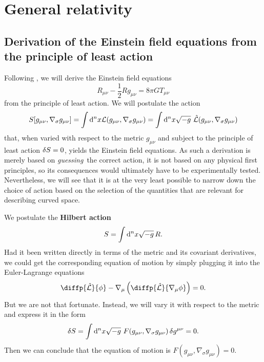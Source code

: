 \appendix

\chapter{General relativity}

\section{Derivation of the Einstein field equations from the principle of least action}
\label{sec:einstein_derivation}

Following \cite[section 4.3]{ref:carroll}, we will derive the Einstein field equations
\begin{equation}
	R_{\mu \nu} - \frac{1}{2} R g_{\mu \nu} = 8 \pi G T_{\mu \nu}
\end{equation}
from the principle of least action.
We will postulate the action
\begin{equation}
	S[g_{\mu \nu}, \nabla_\sigma g_{\mu \nu}] = \int \dif^n x \lagr(g_{\mu \nu}, \nabla_\sigma g_{\mu \nu})
	                                          = \int \dif^n x \sqrt{-g} \hat{\lagr}(g_{\mu \nu}, \nabla_\sigma g_{\mu \nu})
\end{equation}
that, when varied with respect to the metric $g_{\mu \nu}$ and subject to the principle of least action $\delta S = 0$, yields the Einstein field equations.
As such a derivation is merely based on \emph{guessing} the correct action, it is not based on any physical first principles, so its consequences would ultimately have to be experimentally tested.
Nevertheless, we will see that it is at the very least possible to narrow down the choice of action based on the selection of the quantities that are relevant for describing curved space.

We postulate the \textbf{Hilbert action}
\begin{equation}
	S = \int \mathop{}\!\mathrm{d}^n x \sqrt{-g} \, R .
	\label{eq:einstein_derivation:hilbert_action}
\end{equation}
Had it been written directly in terms of the metric and its covariant derivatives, we could get the corresponding equation of motion by simply plugging it into the Euler-Lagrange equations
\begin{equation}
	\diffp{\hat{\lagr}}{\phi} - \nabla_\mu \left( \diffp{\hat{\lagr}}{{\nabla_\mu \phi}} \right) = 0 .
\end{equation}
But we are not that fortunate.
Instead, we will vary it with respect to the metric and express it in the form 
\begin{equation}
	\variation{S} = \int \dif^n x \sqrt{-g} F(g_{\mu \nu}, \nabla_\sigma g_{\mu \nu}) \, \variation{g^{\mu \nu}} = 0 .
	\label{eq:einstein_derivation:action_form}
\end{equation}
Then we can conclude that the equation of motion is $F(g_{\mu \nu}, \nabla_\sigma g_{\mu \nu}) = 0$.

